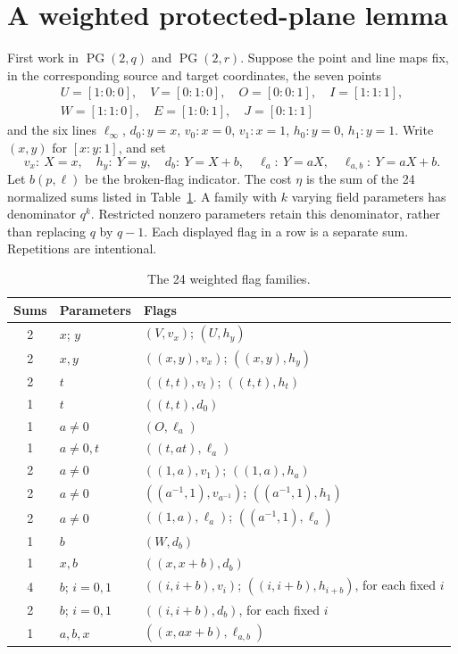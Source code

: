 \documentclass[11pt]{article}
\newcommand{\PG}{\operatorname{PG}}
\begin{document}
\section{A weighted protected-plane lemma}\label{plane}
First work in $\PG(2,q)$ and $\PG(2,r)$. Suppose the point and line maps
fix, in the corresponding source and target coordinates, the seven points
\[
\begin{gathered}
 U=[1:0:0],\quad V=[0:1:0],\quad O=[0:0:1],\quad I=[1:1:1],\\
 W=[1:1:0],\quad E=[1:0:1],\quad J=[0:1:1]
\end{gathered}
\]
and the six lines $\ell_\infty$, $d_0:y=x$, $v_0:x=0$, $v_1:x=1$,
$h_0:y=0$, $h_1:y=1$. Write $(x,y)$ for $[x:y:1]$, and set
\[
 v_x:\ X=x,\quad h_y:\ Y=y,\quad d_b:\ Y=X+b,\quad
 \ell_a:\ Y=aX,\quad\ell_{a,b}:\ Y=aX+b.
\]
Let $b(p,\ell)$ be the broken-flag indicator. The cost $\eta$ is the sum
of the 24 normalized sums listed in Table~\ref{families}. A family with
$k$ varying field parameters has denominator $q^k$. Restricted nonzero
parameters retain this denominator, rather than replacing $q$ by $q-1$.
Each displayed flag in a row is a separate sum. Repetitions are intentional.
\begin{table}[htbp]
\centering\small
\begin{tabular}{@{}clp{9.2cm}@{}}\toprule
Sums&Parameters&Flags\\\midrule
2&$x$; $y$&$(V,v_x)$; $(U,h_y)$\\
2&$x,y$&$((x,y),v_x)$; $((x,y),h_y)$\\
2&$t$&$((t,t),v_t)$; $((t,t),h_t)$\\
1&$t$&$((t,t),d_0)$\\
1&$a\ne0$&$(O,\ell_a)$\\
1&$a\ne0,t$&$((t,at),\ell_a)$\\
2&$a\ne0$&$((1,a),v_1)$; $((1,a),h_a)$\\
2&$a\ne0$&$((a^{-1},1),v_{a^{-1}})$; $((a^{-1},1),h_1)$\\
2&$a\ne0$&$((1,a),\ell_a)$; $((a^{-1},1),\ell_a)$\\
1&$b$&$(W,d_b)$\\
1&$x,b$&$((x,x+b),d_b)$\\
4&$b$; $i=0,1$&$((i,i+b),v_i)$; $((i,i+b),h_{i+b})$, for each fixed $i$\\
2&$b$; $i=0,1$&$((i,i+b),d_b)$, for each fixed $i$\\
1&$a,b,x$&$((x,ax+b),\ell_{a,b})$\\\bottomrule
\end{tabular}
\caption{The 24 weighted flag families.}\label{families}
\end{table}
\end{document}
